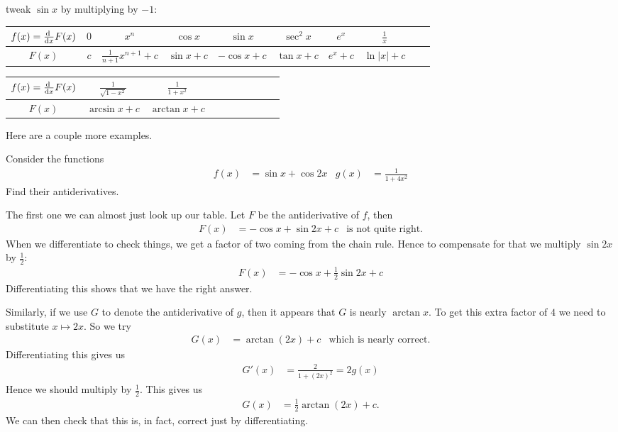 tweak $\sin x$ by multiplying by $-1$:
\renewcommand{\arraystretch}{1.3}
\begin{center}
     \begin{tabular}{|c||c|c|c|c|c|c|c|c|c|}
          \hline
                  $f(x)=\diff{}{x}F(x)$ & $0$ & $x^{n}$ & $\cos x$
                  & $\sin x$
                  &  $\sec^2 x$ & $e^x$ & $\frac{1}{x}$
           \\ \hline
                  $F(x)$ &   $c$ &  $\frac{1}{n+1}x^{n+1}+c$ & $\sin x+c$ &
$-\cos x+c$
                  & $\tan x+c$ & $e^x+c$ & $\ln |x|+c$
           \\ \hline
     \end{tabular}
\end{center}
\begin{center}
     \begin{tabular}{|c||c|c|c|c|c|c|c|c|c|}
          \hline
                  $f(x)=\diff{}{x}F(x)$
                  & $\frac{1}{\sqrt{1-x^2}}$ & $\frac{1}{1+x^2}$
           \\ \hline
                  $F(x)$
                  & $\arcsin x+c$ & $\arctan x+c$
           \\ \hline
     \end{tabular}
\end{center}
\renewcommand{\arraystretch}{1.0}

Here are a couple more examples.
\begin{eg}
Consider the functions
\begin{align*}
  f(x) &= \sin x + \cos 2x & g(x) &= \frac{1}{1+4x^2}
\end{align*}
Find their antiderivatives.

\soln
The first one we can almost just look up our table. Let $F$ be the
antiderivative of $f$, then
\begin{align*}
  F(x) &= -\cos x + \sin 2x + c & \text{is not quite right}.
\end{align*}
When we differentiate to check things, we get a factor of two coming from the
chain rule. Hence to compensate for that we multiply $\sin2x$ by $\frac{1}{2}$:
\begin{align*}
  F(x) &= -\cos x + \frac{1}{2} \sin 2x + c
\end{align*}
Differentiating this shows that we have the right answer.


Similarly, if we use $G$ to denote the antiderivative of $g$, then it appears
that $G$ is nearly $\arctan x$. To get this extra factor of $4$ we need to
substitute $x \mapsto 2x$. So we try
\begin{align*}
  G(x) &= \arctan(2x)+c  & \text{which is nearly correct}.
\end{align*}
Differentiating this gives us
\begin{align*}
  G'(x) &= \frac{2}{1+(2x)^2} = 2g(x)
\end{align*}
Hence we should multiply by $\frac{1}{2}$. This gives us
\begin{align*}
  G(x) &= \frac{1}{2} \arctan(2x) + c.
\end{align*}
We can then check that this is, in fact, correct just by differentiating.
\end{eg}


